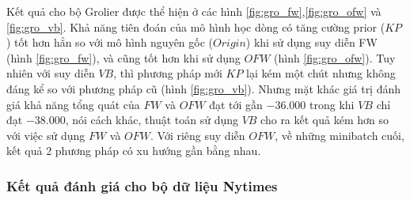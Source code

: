 \documentclass[fontsize=13pt]{scrartcl}
\begin{document}
\par Kết quả cho bộ Grolier được thể hiện ở các hình \ref{fig:gro_fw},\ref{fig:gro_ofw} và \ref{fig:gro_vb}. Khả năng tiên đoán của mô hình học dòng có tăng cường prior ($KP$) tốt hơn hẳn so với mô hình nguyên gốc ($Origin$) khi sử dụng suy diễn FW (hình \ref{fig:gro_fw}), và cũng tốt hơn khi sử dụng $OFW$ (hình \ref{fig:gro_ofw}). Tuy nhiên với suy diễn $VB$, thì phương pháp mới $KP$ lại kém một chút nhưng không đáng kể so với phương pháp cũ (hình \ref{fig:gro_vb}). Nhưng mặt khác giá trị đánh giá khả năng tổng quát của $FW$ và $OFW$ đạt tới gần $-36.000$ trong khi $VB$ chỉ đạt $-38.000$, nói cách khác, thuật toán sử dụng $VB$ cho ra kết quả kém hơn so với việc sử dụng $FW$ và $OFW$. Với riêng suy diễn $OFW$, về những minibatch cuối, kết quả 2 phương pháp có xu hướng gần bằng nhau. 
\newpage
\subsubsection{Kết quả đánh giá cho bộ dữ liệu Nytimes}
\end{document}
